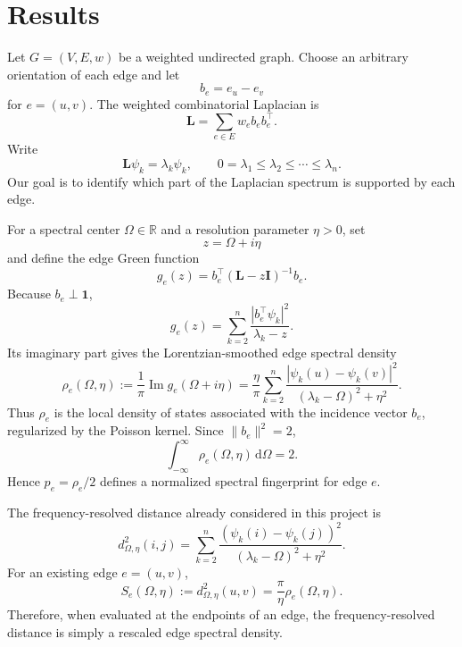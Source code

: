 \documentclass[11pt,reqno]{amsart}
\newcommand{\dd}{\,\mathrm d}
\newcommand{\defeq}{\mathrel{:=}}
\begin{document}
\section{Results}

Let $G=(V,E,w)$ be a weighted undirected graph. Choose an arbitrary orientation of each edge and let
\begin{equation}
b_e=e_u-e_v
\end{equation}
for $e=(u,v)$. The weighted combinatorial Laplacian is
\begin{equation}
\mathbf{L}=\sum_{e\in E}w_e b_e b_e^\intercal.
\label{eq:laplacian-incidence}
\end{equation}
Write
\begin{equation}
\mathbf{L}\psi_k=\lambda_k\psi_k,
\qquad
0=\lambda_1\leq\lambda_2\leq\cdots\leq\lambda_n.
\end{equation}
Our goal is to identify which part of the Laplacian spectrum is supported by each edge.

For a spectral center $\Omega\in\mathbb R$ and a resolution parameter $\eta>0$, set
\begin{equation}
z=\Omega+i\eta
\end{equation}
and define the edge Green function
\begin{equation}
g_e(z)
=b_e^\intercal(\mathbf{L}-z\mathbf{I})^{-1}b_e.
\label{eq:edge-green}
\end{equation}
Because $b_e\perp\mathbf 1$,
\begin{equation}
g_e(z)
=\sum_{k=2}^n
\frac{|b_e^\intercal\psi_k|^2}{\lambda_k-z}.
\end{equation}
Its imaginary part gives the Lorentzian-smoothed edge spectral density
\begin{equation}
\rho_e(\Omega,\eta)
\defeq
\frac{1}{\pi}\operatorname{Im}g_e(\Omega+i\eta)
=
\frac{\eta}{\pi}
\sum_{k=2}^n
\frac{|\psi_k(u)-\psi_k(v)|^2}
{(\lambda_k-\Omega)^2+\eta^2}.
\label{eq:edge-density}
\end{equation}
Thus $\rho_e$ is the local density of states associated with the incidence vector $b_e$, regularized by the Poisson kernel. Since $\|b_e\|^2=2$,
\begin{equation}
\int_{-\infty}^{\infty}
\rho_e(\Omega,\eta)\dd\Omega=2.
\label{eq:density-normalization}
\end{equation}
Hence $p_e=\rho_e/2$ defines a normalized spectral fingerprint for edge $e$.

The frequency-resolved distance already considered in this project is
\begin{equation}
d_{\Omega,\eta}^2(i,j)
=
\sum_{k=2}^{n}
\frac{(\psi_k(i)-\psi_k(j))^2}
{(\lambda_k-\Omega)^2+\eta^2}.
\label{eq:spectral-distance}
\end{equation}
For an existing edge $e=(u,v)$,
\begin{equation}
S_e(\Omega,\eta)
\defeq d_{\Omega,\eta}^2(u,v)
=\frac{\pi}{\eta}\rho_e(\Omega,\eta).
\label{eq:response-density}
\end{equation}
Therefore, when evaluated at the endpoints of an edge, the frequency-resolved distance is simply a rescaled edge spectral density.
\end{document}
